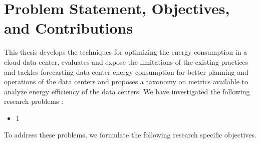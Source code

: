 \documentclass[review]{elsarticle}
\begin{document}
\section{Problem Statement, Objectives, and Contributions}  
This thesis develops the techniques for optimizing the energy consumption in a cloud data center, evaluates and expose the limitations of the existing practices and tackles forecasting data center energy consumption for better planning and operations of the data centers and proposes a taxonomy on metrics available to analyze energy efficiency of the data centers. We have investigated the following research problems :
\begin{itemize}
	\item 1
\end{itemize}


To address these problems, we formulate the following   research specific  objectives.
\end{document}
